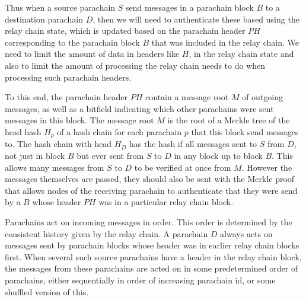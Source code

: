 Thus when a source parachain $S$ send messages in a parachain block $B$ to a destination parachain $D$, then we will need to authenticate these based using the relay chain state, which is updated based on the parachain header $PH$ corresponding to the parachain block $B$ that was included in the relay chain. We need to limit the amount of data in headers like $H$, in the relay chain state and also to limit the amount of processing the relay chain needs to do when processing such parachain headers.

To this end, the parachain header $PH$ contain a message root $M$ of outgoing messages, as well as a bitfield indicating which other parachains were sent messages in this block.
The message root $M$ is the root of a Merkle tree of the head hash $H_p$ of a hash chain for each parachain $p$ that this block send messages to.  The hash chain with head $H_D$ has the hash if all messages sent to $S$ from $D$, not just in block $B$ but ever sent from $S$ to $D$ in any block up to block $B$. This allows many messages from $S$ to $D$  to be verified at once from $M$. However the messages themselves are passed, they should also be sent with the Merkle proof that allows nodes of the receiving parachain
to authenticate that they were send by a $B$ whose header  $PH$ was in a particular relay chain block. 

Parachains act on incoming messages in order. This order is determined by the consistent history given by the relay chain. A parachain $D$ always acts on messages sent by parachain blocks whose header was in earlier relay chain blocks first. When several such source parachains have a header in the relay chain block, the messages from these parachains are acted on in some predetermined order of parachains, either sequentially in order of increasing parachain id, or some shuffled version of this. 

